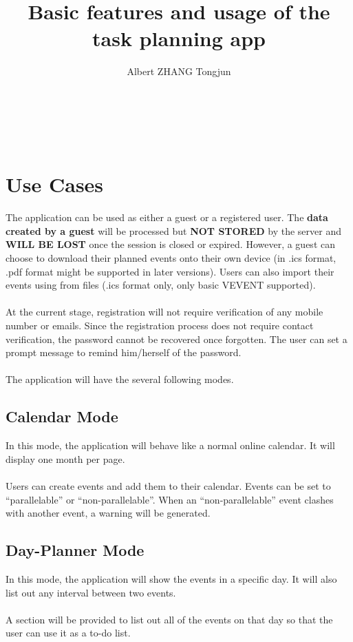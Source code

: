 \documentclass{article}[12pt]
\title{Basic features and usage of the task planning app}
\author{Albert ZHANG Tongjun}
\begin{document}
\maketitle
\tableofcontents
~\\~\\


\section{Use Cases}
The application can be used as either a guest or a registered user.
The \textbf{data created by a guest} will be processed but \textbf{NOT STORED} by the server and \textbf{WILL BE LOST} once the session is closed or expired.
However, a guest can choose to download their planned events onto their own device (in .ics format, .pdf format might be supported in later versions).
Users can also import their events using from files (.ics format only, only basic VEVENT supported).
~\\~\\
At the current stage, registration will not require verification of any mobile number or emails.
Since the registration process does not require contact verification, the password cannot be recovered once forgotten. The user can set a prompt message to remind him/herself of the password.
~\\~\\
The application will have the several following modes.
~\\

\subsection{Calendar Mode}
In this mode, the application will behave like a normal online calendar.
It will display one month per page.
~\\~\\
Users can create events and add them to their calendar.
Events can be set to ``parallelable'' or ``non-parallelable''.
When an ``non-parallelable'' event clashes with another event, a warning will be generated.
~\\

\subsection{Day-Planner Mode}
In this mode, the application will show the events in a specific day.
It will also list out any interval between two events.
~\\~\\
A section will be provided to list out all of the events on that day so that the user can use it as a to-do list.
~\\
\end{document}
